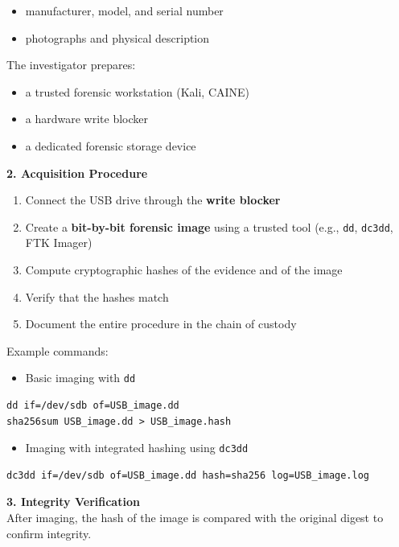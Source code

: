 \begin{itemize}
\item manufacturer, model, and serial number
\item photographs and physical description
\end{itemize}

\noindent
The investigator prepares:

\begin{itemize}
\item a trusted forensic workstation (Kali, CAINE)
\item a hardware write blocker
\item a dedicated forensic storage device
\end{itemize}

\noindent
\textbf{2. Acquisition Procedure}

\begin{enumerate}
\item Connect the USB drive through the \textbf{write blocker}
\item Create a \textbf{bit-by-bit forensic image} using a trusted tool (e.g., \texttt{dd}, \texttt{dc3dd}, FTK Imager)
\item Compute cryptographic hashes of the evidence and of the image
\item Verify that the hashes match
\item Document the entire procedure in the chain of custody
\end{enumerate}

\noindent
Example commands:

\begin{itemize}
\item Basic imaging with \texttt{dd}
\end{itemize}

\begin{verbatim}
dd if=/dev/sdb of=USB_image.dd
sha256sum USB_image.dd > USB_image.hash
\end{verbatim}

\begin{itemize}
\item Imaging with integrated hashing using \texttt{dc3dd}
\end{itemize}

\begin{verbatim}
dc3dd if=/dev/sdb of=USB_image.dd hash=sha256 log=USB_image.log
\end{verbatim}

\noindent
\textbf{3. Integrity Verification}\\
\noindent
After imaging, the hash of the image is compared with the original digest to confirm integrity.
\medskip

